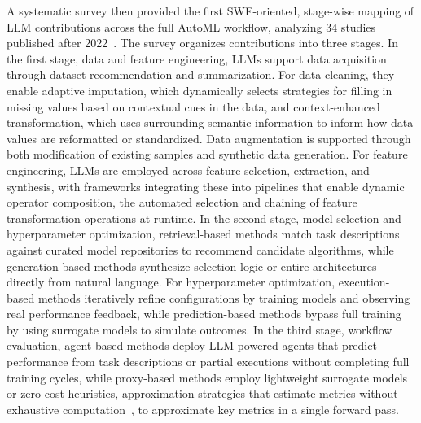 \documentclass[
english,                 %
bibtex,                  %
includeExtraAbstracts, %
]{kththesis}
\numberwithin{listing}{chapter}
\begin{document}
A systematic survey then provided the first \gls{SWE}-oriented, stage-wise mapping of \gls{LLM} contributions across the full \gls{AutoML} workflow, analyzing 34 studies published after 2022~\cite{gu_large_2025}. The survey organizes contributions into three stages. In the first stage, data and feature engineering, \glspl{LLM} support data acquisition through dataset recommendation and summarization. For data cleaning, they enable adaptive imputation, which dynamically selects strategies for filling in missing values based on contextual cues in the data, and context-enhanced transformation, which uses surrounding semantic information to inform how data values are reformatted or standardized. Data augmentation is supported through both modification of existing samples and synthetic data generation. For feature engineering, \glspl{LLM} are employed across feature selection, extraction, and synthesis, with frameworks integrating these into pipelines that enable dynamic operator composition, the automated selection and chaining of feature transformation operations at runtime. In the second stage, model selection and hyperparameter optimization, retrieval-based methods match task descriptions against curated model repositories to recommend candidate algorithms, while generation-based methods synthesize selection logic or entire architectures directly from natural language. For hyperparameter optimization, execution-based methods iteratively refine configurations by training models and observing real performance feedback, while prediction-based methods bypass full training by using surrogate models to simulate outcomes. In the third stage, workflow evaluation, agent-based methods deploy \gls{LLM}-powered agents that predict performance from task descriptions or partial executions without completing full training cycles, while proxy-based methods employ lightweight surrogate models or zero-cost heuristics, approximation strategies that estimate metrics without exhaustive computation~\cite{hart_formal_1968}, to approximate key metrics in a single forward pass.
\end{document}
